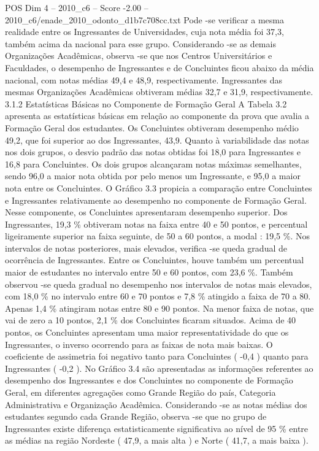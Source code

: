 \begin{textsample}{POS Dim 4 – 2010\_c6 – Score -2.00 – 2010\_c6/enade\_2010\_odonto\_d1b7c708cc.txt}
Pode -se verificar a mesma realidade entre os Ingressantes de Universidades, cuja nota média foi 37,3, também acima da nacional para esse grupo.
Considerando -se as demais Organizações Acadêmicas, observa -se que nos Centros Universitários e Faculdades, o desempenho de Ingressantes e de Concluintes ficou abaixo da média nacional, com notas médias 49,4 e 48,9, respectivamente.
Ingressantes das mesmas Organizações Acadêmicas obtiveram médias 32,7 e 31,9, respectivamente. 3.1.2 Estatísticas Básicas no Componente de Formação Geral A Tabela 3.2 apresenta as estatísticas básicas em relação ao componente da prova que avalia a Formação Geral dos estudantes.
Os Concluintes obtiveram desempenho médio 49,2, que foi superior ao dos Ingressantes, 43,9.
Quanto à variabilidade das notas nos dois grupos, o desvio padrão das notas obtidas foi 18,0 para Ingressantes e 16,8 para Concluintes.
Os dois grupos alcançaram notas máximas semelhantes, sendo 96,0 a maior nota obtida por pelo menos um Ingressante, e 95,0 a maior nota entre os Concluintes.
O Gráfico 3.3 propicia a comparação entre Concluintes e Ingressantes relativamente ao desempenho no componente de Formação Geral.
Nesse componente, os Concluintes apresentaram desempenho superior.
Dos Ingressantes, 19,3 \% obtiveram notas na faixa entre 40 e 50 pontos, e percentual ligeiramente superior na faixa seguinte, de 50 a 60 pontos, a modal : 19,5 \%.
Nos intervalos de notas posteriores, mais elevados, verifica -se queda gradual de ocorrência de Ingressantes.
Entre os Concluintes, houve também um percentual maior de estudantes no intervalo entre 50 e 60 pontos, com 23,6 \%.
Também observou -se queda gradual no desempenho nos intervalos de notas mais elevados, com 18,0 \% no intervalo entre 60 e 70 pontos e 7,8 \% atingido a faixa de 70 a 80.
Apenas 1,4 \% atingiram notas entre 80 e 90 pontos.
Na menor faixa de notas, que vai de zero a 10 pontos, 2,1 \% dos Concluintes ficaram situados.
Acima de 40 pontos, os Concluintes apresentam uma maior representatividade do que os Ingressantes, o inverso ocorrendo para as faixas de nota mais baixas.
O coeficiente de assimetria foi negativo tanto para Concluintes ( -0,4 ) quanto para Ingressantes ( -0,2 ).
No Gráfico 3.4 são apresentadas as informações referentes ao desempenho dos Ingressantes e dos Concluintes no componente de Formação Geral, em diferentes agregações como Grande Região do país, Categoria Administrativa e Organização Acadêmica.
Considerando -se as notas médias dos estudantes segundo cada Grande Região, observa -se que no grupo de Ingressantes existe diferença estatisticamente significativa ao nível de 95 \% entre as médias na região Nordeste ( 47,9, a mais alta ) e Norte ( 41,7, a mais baixa ).

\end{textsample}

